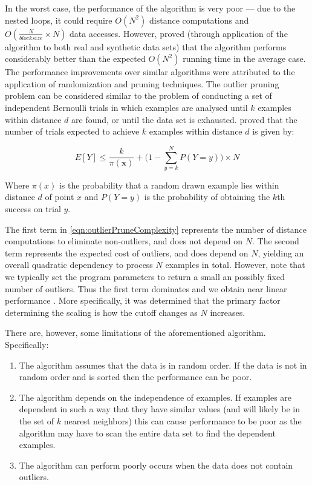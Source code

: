 In the worst case, the performance of the algorithm is very poor --- due to the
nested loops, it could require $O(N^{2})$ distance computations and
$O(\frac{N}{blocksize} \times N)$ data accesses. However, \citeauthor{Bay:2003}
proved (through application of the algorithm to both real and synthetic data
sets) that the algorithm performs considerably better than the expected
$O(N^{2})$ running time in the average case. The performance improvements over
similar algorithms were attributed to the application of randomization and
pruning techniques. The outlier pruning problem can be considered similar to the
problem of conducting a set of independent Bernoulli trials in which examples
are analysed until $k$ examples within distance $d$ are found, or until the data
set is exhausted. \citeauthor{Bay:2003} proved that the number of trials
expected to achieve $k$ examples within distance $d$ is given by:

\begin{equation}
\label{eqn:outlierPruneComplexity}
E[Y] \leq \frac{k}{\pi(\textbf{x})} + \Bigg(1 - \sum_{y=k}^{N} P(Y=y)\Bigg) \times N
\end{equation}

Where $\pi(x)$ is the probability that a random drawn example lies within
distance $d$ of point $x$ and $P(Y=y)$ is the probability of obtaining the $k$th
success on trial $y$.

The first term in \autoref{eqn:outlierPruneComplexity} represents the number of
distance computations to eliminate non-outliers, and does not depend on $N$. The
second term represents the expected cost of outliers, and does depend on $N$,
yielding an overall quadratic dependency to process $N$ examples in total.
However, note that we typically set the program parameters to return a small an
possibly fixed number of outliers. Thus the first term dominates and we obtain
near linear performance \cite{Bay:2003}. More specifically, it was determined
that the primary factor determining the scaling is how the cutoff changes as $N$
increases.

There are, however, some limitations of the aforementioned algorithm.
Specifically:
\begin{enumerate}
    \item The algorithm assumes that the data is in random order. If the data is
        not in random order and is sorted then the performance can be poor.
    \item The algorithm depends on the independence of examples. If examples are
        dependent in such a way that they have similar values (and will likely
        be in the set of $k$ nearest neighbors) this can cause performance to be
        poor as the algorithm may have to scan the entire data set to find the
        dependent examples.
    \item The algorithm can perform poorly occurs when the data does not contain
        outliers.
\end{enumerate}

